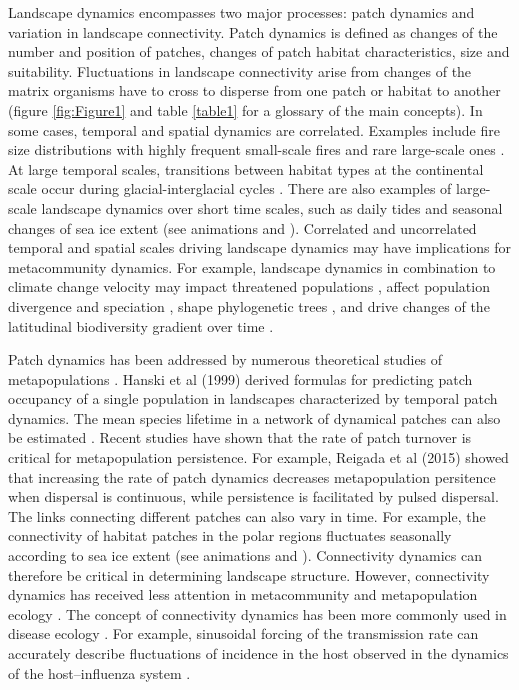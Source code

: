 \documentclass[a4paper,12pt]{article}
\begin{document}
Landscape dynamics encompasses two major processes: patch dynamics and variation in landscape connectivity. Patch dynamics is defined as changes of the number and position of patches, changes of patch habitat characteristics, size and suitability. Fluctuations in landscape connectivity arise from changes of the matrix organisms have to cross to disperse from one patch or habitat to another (figure \ref{fig:Figure1} and table \ref{table1} for a glossary of the main concepts). In some cases, temporal and spatial dynamics are correlated. Examples include fire size distributions with highly frequent small-scale fires and rare large-scale ones \citep{GEB:GEB12246}. At large temporal scales, transitions between habitat types at the continental scale occur during glacial-interglacial cycles \citep{WerneckEtAl2011}. There are also examples of large-scale landscape dynamics over short time scales, such as daily tides and seasonal changes of sea ice extent (see animations  and ). Correlated and uncorrelated temporal and spatial scales driving landscape dynamics may have implications for metacommunity dynamics. For example, landscape dynamics in combination to climate change velocity may impact threatened populations \citep{loarieetal2009}, affect population divergence and speciation \citep{aguileetal2011}, shape phylogenetic trees \citep{Gascueletal2015}, and drive changes of the latitudinal biodiversity gradient over time \citep{mannionetal2014}.

Patch dynamics has been addressed by numerous theoretical studies of metapopulations \citep{Hanski1999, Cornell&Ovaskainen2008, DrechslerJohst2010}. Hanski et al (1999) derived formulas for predicting patch occupancy of a single population in landscapes characterized by temporal patch dynamics. The mean species lifetime in a network of dynamical patches can also be estimated \citep{DrechslerJohst2010}. Recent studies have shown that the rate of patch turnover is critical for metapopulation persistence. For example, Reigada et al (2015)\citep{reigadaetal2015} showed that increasing the rate of patch dynamics decreases metapopulation persitence when dispersal is continuous, while persistence is facilitated by pulsed dispersal. The links connecting different patches can also vary in time. For example, the connectivity of habitat patches in the polar regions fluctuates seasonally according to sea ice extent (see animations  and ). Connectivity dynamics can therefore be critical in determining landscape structure. However, connectivity dynamics has received less attention in metacommunity and metapopulation ecology \citep{Holyoaketal2005,JohstEtAl2011,Yannicetal2014}. The concept of connectivity dynamics has been more commonly used in disease ecology \citep{Dushoffetal2004, Keeling&Eames2005, Ross2010}. For example, sinusoidal forcing of the transmission rate can accurately describe fluctuations of incidence in the host observed in the dynamics of the host–influenza system \citep{Dushoffetal2004}.
\end{document}
